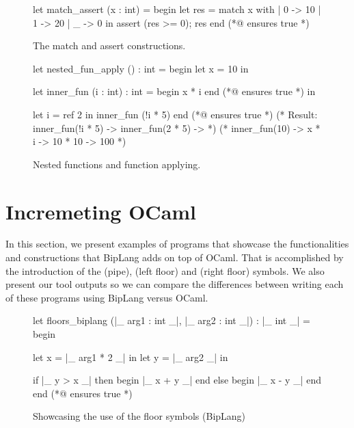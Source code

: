 \begin{figure}
\begin{minipage}{\linewidth}
\begin{biplangenv}
  let match_assert (x : int) = begin
    let res = 
      match x with 
      | 0 -> 10
      | 1 -> 20
      | _ -> 0
    in
    assert (res >= 0);
    res
  end
  (*@ ensures true *) 
\end{biplangenv}
\end{minipage}
\caption{The match and assert constructions.}
\end{figure}

\begin{figure}
\begin{minipage}{\linewidth}
\begin{biplangenv}
  let nested_fun_apply () : int = begin
    let x = 10 in

    let inner_fun (i : int) : int = begin
      x * i 
    end
    (*@ ensures true *)
    in

    let i = ref 2 in
    inner_fun (!i * 5)
  end
  (*@ ensures true *) 
  (* Result: inner_fun(!i * 5) -> inner_fun(2 * 5) -> *)
  (*         inner_fun(10) -> x * i -> 10 * 10 -> 100 *)
\end{biplangenv}
\end{minipage}
\caption{Nested functions and function applying.}
\end{figure}


\section{Incremeting OCaml}
\label{sec:incrementing}

In this section, we present examples of programs that showcase the functionalities and constructions that BipLang adds on top of OCaml.
That is accomplished by the introduction of the \bm{$\langle|\rangle$} (pipe), \bm{$\lfloor$} (left floor) and \bm{$\rfloor$} (right floor) symbols.
We also present our tool outputs so we can compare the differences between writing each of these programs using BipLang versus OCaml.


\begin{figure}
\begin{minipage}{\linewidth}
\begin{biplangenv}
  let floors_biplang (|_ arg1 : int _|, |_ arg2 : int _|)
    : |_ int _| = begin

    let x = |_ arg1 * 2 _| in
    let y = |_ arg2 _| in

    if |_ y > x _| then begin
      |_ x + y _|
    end else begin
      |_ x - y _|
    end
  end
  (*@ ensures true *)
\end{biplangenv}
\end{minipage}
\caption{Showcasing the use of the floor symbols (BipLang)}
\end{figure}

